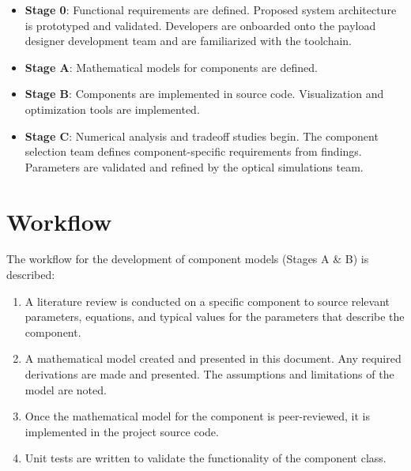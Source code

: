 \documentclass{article}
\begin{document}
\begin{itemize}
    \item \textbf{Stage 0}: Functional requirements are defined. Proposed system architecture is prototyped and validated. Developers are onboarded onto the payload designer development team and are familiarized with the toolchain.
    
    \item \textbf{Stage A}: Mathematical models for components are defined.
    
    \item \textbf{Stage B}: Components are implemented in source code. Visualization and optimization tools are implemented.
    
    \item \textbf{Stage C}: Numerical analysis and tradeoff studies begin. The component selection team defines component-specific requirements from findings. Parameters are validated and refined by the optical simulations team.
    
\end{itemize}

\section{Workflow}
The workflow for the development of component models (Stages A \& B) is described:

\begin{enumerate}
    \item A literature review is conducted on a specific component to source relevant parameters, equations, and typical values for the parameters that describe the component.
    \item A mathematical model created and presented in this document. Any required derivations are made and presented. The assumptions and limitations of the model are noted.
    \item Once the mathematical model for the component is peer-reviewed, it is implemented in the project source code.
    \item Unit tests are written to validate the functionality of the component class.
\end{enumerate}


\newpage
\printbibliography




\end{document}
